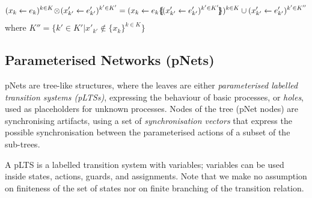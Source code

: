 \documentclass{lmcs}
\newcommand{\ERIC}[1]{\textcolor{blue}{#1}}
\newcommand{\LUDO}[1]{\textcolor{darkgreen}{#1}}
\newcommand{\shortotimes}{\!\otimes\!}
\begin{document}
\[(x_{k}\gets e_{k})^{k\in K}\shortotimes (x'_{k'}\gets e'_{k'})^{k'\in K'} =  
(x_{k}\gets e_{k}\subst{(x'_{k'}\gets e'_{k'})^{k'\in K'}})^{k\in K} \cup (x'_{k'}\gets e'_{k'})^{k'\in K''}\]
where $K''=\{k'\in K'|x'_{k'}\not\in\{x_k\}^{k\in K}\}$
%
%
% 

\subsection{Parameterised Networks (pNets)}
\label{section:pnets}

pNets are tree-like structures, where the leaves are either
\emph{parameterised labelled transition systems (pLTSs)}, expressing the
behaviour of basic processes, or \emph{holes}, used as placeholders
for unknown processes. 
Nodes of the tree (pNet nodes) are synchronising artifacts, using a
set of \emph{synchronisation vectors} that express the possible
synchronisation between the parameterised actions of a subset of the
sub-trees.



A pLTS is a labelled transition system with variables; variables can be
used inside states, actions, guards, and
assignments. 
Note that we make no assumption on finiteness of the set of states nor
on finite branching of the transition relation.
\end{document}
